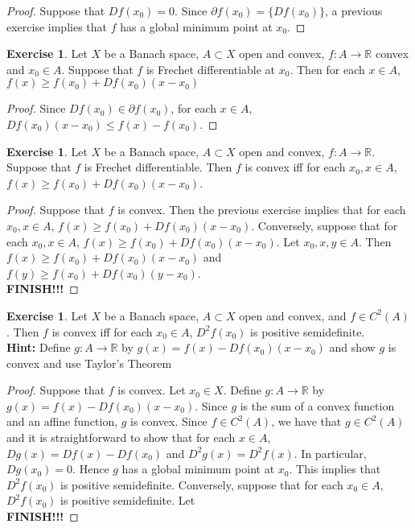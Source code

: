 \documentclass[12pt]{amsart}
\theoremstyle{definition}
\newtheorem{ex}[definition]{Exercise}
\newcommand{\R}{\mathbb{R}}
\newcommand{\tbf}[1]{\textbf{#1}}
\newcommand{\p}{\partial}
\DeclareMathOperator*{\0}{\mbf{0}}
\DeclareMathOperator*{\1}{\mbf{1}}
\newcommand{\lex}[1]{\label{ex:#1}}
\begin{document}
	\begin{proof}
	Suppose that $Df(x_0) = 0$. Since $\p f(x_0) = \{Df(x_0)\}$, a previous exercise implies that $f$ has a global minimum point at $x_0$. 
	\end{proof}
	
	\begin{ex}
	Let $X$ be a Banach space, $A \subset X$ open and convex, $f:A \rightarrow \R$ convex and $x_0 \in A$. Suppose that $f$ is Frechet differentiable at $x_0$. Then for each $x \in A$, $f(x) \geq f(x_0) + Df(x_0)(x - x_0)$
	\end{ex}
	
	\begin{proof}
	Since $Df(x_0) \in \p f(x_0)$, for each $x \in A$, $Df(x_0)(x - x_0) \leq f(x) - f(x_0)$.
	\end{proof}
	
	\begin{ex}
	Let $X$ be a Banach space, $A \subset X$ open and convex, $f:A \rightarrow \R$. Suppose that $f$ is Frechet differentiable. Then $f$ is convex iff for each $x_0, x \in A$, $f(x) \geq f(x_0) + Df(x_0)(x - x_0)$.
	\end{ex}
	
	\begin{proof}
	Suppose that $f$ is convex. Then the previous exercise implies that for each $x_0,x \in A$, $f(x) \geq f(x_0) + Df(x_0)(x - x_0)$. Conversely, suppose that for each $x_0,x \in A$, $f(x) \geq f(x_0) + Df(x_0)(x - x_0)$. Let $x_0, x, y \in A$. Then $f(x) \geq f(x_0) + Df(x_0)(x - x_0)$ and $f(y) \geq f(x_0) + Df(x_0)(y - x_0)$. \\
	\tbf{FINISH!!!}
	\end{proof}
	
	\begin{ex} \lex{}
	Let $X$ be a Banach space, $A \subset X$ open and convex, and $f \in C^2(A)$. Then $f$ is convex iff for each $x_0 \in A$, $D^2f(x_0)$ is positive semidefinite.\\
	\tbf{Hint:} Define $g:A \rightarrow \R$ by $g(x) = f(x) - Df(x_0)(x - x_0)$ and show $g$ is convex and use Taylor's Theorem
	\end{ex}
	
	\begin{proof}
	Suppose that $f$ is convex. Let $x_0 \in X$. Define $g:A \rightarrow \R$ by $g(x) = f(x) - Df(x_0)(x - x_0)$. Since $g$ is the sum of a convex function and an affine function, $g$ is convex. Since $f \in C^2(A)$, we have that $g \in C^2(A)$ and it is straightforward to show that for each $x \in A$, $Dg(x) = Df(x) - Df(x_0)$ and $D^2g(x) = D^2f(x)$. In particular, $Dg(x_0) = 0$. Hence $g$ has a global minimum point at $x_0$. This implies that $D^2f(x_0)$ is positive semidefinite. 
	Conversely, suppose that for each $x_0 \in A$, $D^2f(x_0)$ is positive semidefinite. Let  \\
	\tbf{FINISH!!!}
	\end{proof}
	
\end{document}
